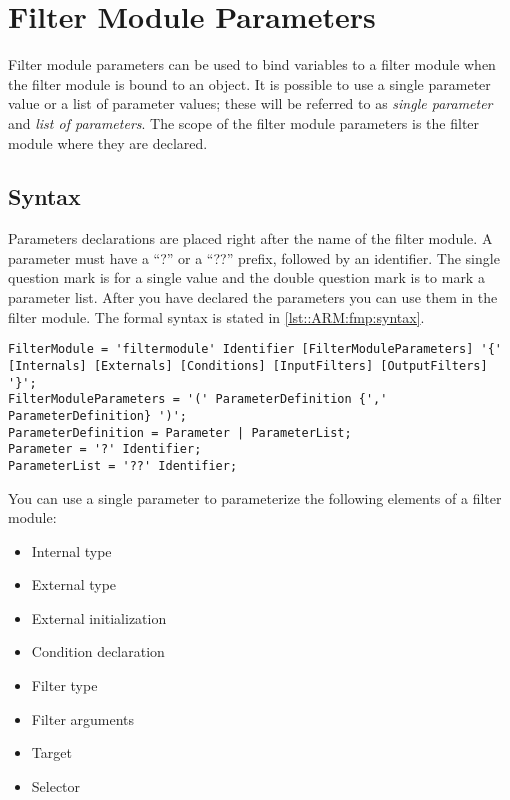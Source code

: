 \chapter{Filter Module Parameters}
Filter module parameters can be used to bind variables to a filter module when the filter module is bound to an object.
It is possible to use a single parameter value or a list of parameter values; these will be referred to as \emph{single parameter} and \emph{list of parameters}.
The scope of the filter module parameters is the filter module where they are declared.

\section{Syntax}
Parameters declarations are placed right after the name of the filter module. 
A parameter must have a ``?'' or a ``??'' prefix, followed by an identifier.
The single question mark is for a single value and the double question mark is to mark a parameter list.
After you have declared the parameters you can use them in the filter module. The formal syntax is stated in \autoref{lst::ARM:fmp:syntax}.

\begin{lstlisting}[caption = {Parameter declaration syntax}, label = lst::ARM:fmp:syntax,
style = listing, language = ebnf, float = tpb]
FilterModule = 'filtermodule' Identifier [FilterModuleParameters] '{' [Internals] [Externals] [Conditions] [InputFilters] [OutputFilters] '}';                                    
FilterModuleParameters = '(' ParameterDefinition {',' ParameterDefinition} ')';
ParameterDefinition = Parameter | ParameterList;
Parameter = '?' Identifier;
ParameterList = '??' Identifier;
\end{lstlisting}

You can use a single parameter to parameterize the following elements of a filter module:%
\begin{itemize}[noitemsep]
\item Internal type
\item External type
\item External initialization
\item Condition declaration
\item Filter type
\item Filter arguments
\item Target
\item Selector
\end{itemize}

